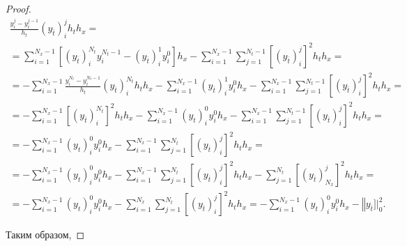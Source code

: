 \begin{proof}
\begin{multline}
\frac{y_{i}^{j}-y_{i}^{j-1}}{h_t}(y_{\overline{t}})_{i}^{j} h_t h_x=

\\

=\sum\limits_{i=1}^{N_x-1}\left[(y_{\overline{t}})_{i}^{N_t} y_{i}^{N_t-1}

-(y_{\overline{t}})_{i}^{1} y_{i}^{0}\right]h_x-\sum\limits_{i=1}^{N_x-1}\sum\limits_{j=1}^{N_t-1}

\left[(y_{\overline{t}})_{i}^{j} \right]^2 h_t h_x=

\\

=-\sum\limits_{i=1}^{N_x-1}\frac{y_{i}^{N_t}

- y_{i}^{N_t-1}}{h_t}(y_{\overline{t}})_{i}^{N_t} h_t h_x-\sum\limits_{i=1}^{N_x-1}(y_{\overline{t}})_{i}^{1} y_{i}^{0} h_x-\sum\limits_{i=1}^{N_x-1}\sum\limits_{j=1}^{N_t-1}

\left[(y_{\overline{t}})_{i}^{j} \right]^2 h_t h_x=

\\

=

-\sum\limits_{i=1}^{N_x-1}\left[\left(y_{\overline{t}}\right)_{i}^{N_t}\right]^2 h_t h_x-\sum\limits_{i=1}^{N_x-1}(y_t)_{i}^{0} y_{i}^{0} h_x-\sum\limits_{i=1}^{N_x-1}\sum\limits_{j=1}^{N_t-1}

\left[(y_{\overline{t}})_{i}^{j} \right]^2 h_t h_x=

\\

=-\sum\limits_{i=1}^{N_x-1}(y_t)_{i}^{0} y_{i}^{0} h_x-\sum\limits_{i=1}^{N_x-1}\sum\limits_{j=1}^{N_t}\left[(y_{\overline{t}})_{i}^{j} \right]^2 h_t h_x=

\\

=-\sum\limits_{i=1}^{N_x-1}(y_t)_{i}^{0} y_{i}^{0} h_x-\sum\limits_{i=1}^{N_x-1}\sum\limits_{j=1}^{N_t}\left[(y_{\overline{t}})_{i}^{j} \right]^2 h_t h_x-\sum\limits_{j=1}^{N_t}\left[(y_{\overline{t}})_{N_x}^{j} \right]^2 h_t h_x=

\\

=-\sum\limits_{i=1}^{N_x-1}(y_t)_{i}^{0} y_{i}^{0} h_x-\sum\limits_{i=1}^{N_x}\sum\limits_{j=1}^{N_t}\left[(y_{\overline{t}})_{i}^{j} \right]^2 h_t h_x=-\sum\limits_{i=1}^{N_x-1}(y_t)_{i}^{0} y_{i}^{0} h_x-\left\Vert y_{\overline{t}}\right.]|_{0}^{2}.

\end{multline}

Таким образом, 


\end{proof}
